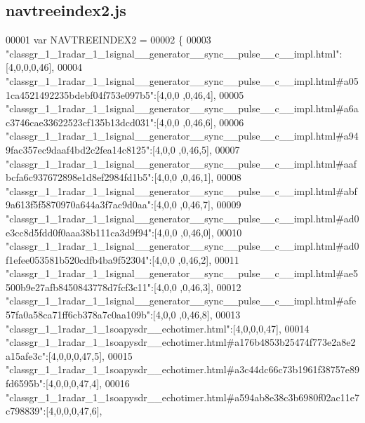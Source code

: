 \subsection{navtreeindex2.\+js}
\label{navtreeindex2_8js_source}

\begin{DoxyCode}
00001 var NAVTREEINDEX2 =
00002 \{
00003 \textcolor{stringliteral}{"classgr\_1\_1radar\_1\_1signal\_\_generator\_\_sync\_\_pulse\_\_c\_\_impl.html"}:[4,0,0,0,46],
00004 \textcolor{stringliteral}{"classgr\_1\_1radar\_1\_1signal\_\_generator\_\_sync\_\_pulse\_\_c\_\_impl.html#a051ca4521492235bdebf04f753e097b5"}:[4,0,0
      ,0,46,4],
00005 \textcolor{stringliteral}{"classgr\_1\_1radar\_1\_1signal\_\_generator\_\_sync\_\_pulse\_\_c\_\_impl.html#a6ac3746cae33622523cf135b13dcd031"}:[4,0,0
      ,0,46,6],
00006 \textcolor{stringliteral}{"classgr\_1\_1radar\_1\_1signal\_\_generator\_\_sync\_\_pulse\_\_c\_\_impl.html#a949fac357ec9daaf4bd2c2fea14c8125"}:[4,0,0
      ,0,46,5],
00007 \textcolor{stringliteral}{"classgr\_1\_1radar\_1\_1signal\_\_generator\_\_sync\_\_pulse\_\_c\_\_impl.html#aafbcfa6c937672898e1d8ef2984fd1b5"}:[4,0,0
      ,0,46,1],
00008 \textcolor{stringliteral}{"classgr\_1\_1radar\_1\_1signal\_\_generator\_\_sync\_\_pulse\_\_c\_\_impl.html#abf9a613f5f5870970a644a3f7ac9d0aa"}:[4,0,0
      ,0,46,7],
00009 \textcolor{stringliteral}{"classgr\_1\_1radar\_1\_1signal\_\_generator\_\_sync\_\_pulse\_\_c\_\_impl.html#ad0e3cc8d5fdd0f0aaa38b111ca3d9f94"}:[4,0,0
      ,0,46,0],
00010 \textcolor{stringliteral}{"classgr\_1\_1radar\_1\_1signal\_\_generator\_\_sync\_\_pulse\_\_c\_\_impl.html#ad0f1efee053581b520cdfb4ba9f52304"}:[4,0,0
      ,0,46,2],
00011 \textcolor{stringliteral}{"classgr\_1\_1radar\_1\_1signal\_\_generator\_\_sync\_\_pulse\_\_c\_\_impl.html#ae5500b9e27afb8450843778d7fcf3c11"}:[4,0,0
      ,0,46,3],
00012 \textcolor{stringliteral}{"classgr\_1\_1radar\_1\_1signal\_\_generator\_\_sync\_\_pulse\_\_c\_\_impl.html#afe57fa0a58ca71ff6cb378a7c0aa109b"}:[4,0,0
      ,0,46,8],
00013 \textcolor{stringliteral}{"classgr\_1\_1radar\_1\_1soapysdr\_\_echotimer.html"}:[4,0,0,0,47],
00014 \textcolor{stringliteral}{"classgr\_1\_1radar\_1\_1soapysdr\_\_echotimer.html#a176b4853b25474f773e2a8e2a15afe3c"}:[4,0,0,0,47,5],
00015 \textcolor{stringliteral}{"classgr\_1\_1radar\_1\_1soapysdr\_\_echotimer.html#a3c44dc66c73b1961f38757e89fd6595b"}:[4,0,0,0,47,4],
00016 \textcolor{stringliteral}{"classgr\_1\_1radar\_1\_1soapysdr\_\_echotimer.html#a594ab8e38c3b6980f02ac11e7c798839"}:[4,0,0,0,47,6],

\end{DoxyCode}
